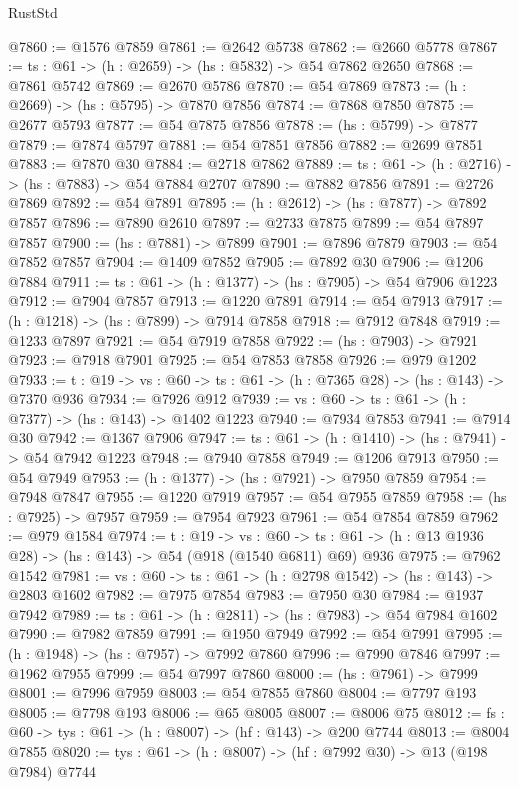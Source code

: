 \begin{lexlean}{RustStd}
\begin{coremodule}
@7860 := @1576 @7859
@7861 := @2642 @5738
@7862 := @2660 @5778
@7867 := {ts : @61} -> (h : @2659) -> (hs : @5832) -> @54 @7862 @2650
@7868 := @7861 @5742
@7869 := @2670 @5786
@7870 := @54 @7869
@7873 := (h : @2669) -> (hs : @5795) -> @7870 @7856
@7874 := @7868 @7850
@7875 := @2677 @5793
@7877 := @54 @7875 @7856
@7878 := (hs : @5799) -> @7877
@7879 := @7874 @5797
@7881 := @54 @7851 @7856
@7882 := @2699 @7851
@7883 := @7870 @30
@7884 := @2718 @7862
@7889 := {ts : @61} -> (h : @2716) -> (hs : @7883) -> @54 @7884 @2707
@7890 := @7882 @7856
@7891 := @2726 @7869
@7892 := @54 @7891
@7895 := (h : @2612) -> (hs : @7877) -> @7892 @7857
@7896 := @7890 @2610
@7897 := @2733 @7875
@7899 := @54 @7897 @7857
@7900 := (hs : @7881) -> @7899
@7901 := @7896 @7879
@7903 := @54 @7852 @7857
@7904 := @1409 @7852
@7905 := @7892 @30
@7906 := @1206 @7884
@7911 := {ts : @61} -> (h : @1377) -> (hs : @7905) -> @54 @7906 @1223
@7912 := @7904 @7857
@7913 := @1220 @7891
@7914 := @54 @7913
@7917 := (h : @1218) -> (hs : @7899) -> @7914 @7858
@7918 := @7912 @7848
@7919 := @1233 @7897
@7921 := @54 @7919 @7858
@7922 := (hs : @7903) -> @7921
@7923 := @7918 @7901
@7925 := @54 @7853 @7858
@7926 := @979 @1202
@7933 := {t : @19} -> {vs : @60} -> {ts : @61} -> (h : @7365 @28) -> (hs : @143) -> @7370 @936
@7934 := @7926 @912
@7939 := {vs : @60} -> {ts : @61} -> (h : @7377) -> (hs : @143) -> @1402 @1223
@7940 := @7934 @7853
@7941 := @7914 @30
@7942 := @1367 @7906
@7947 := {ts : @61} -> (h : @1410) -> (hs : @7941) -> @54 @7942 @1223
@7948 := @7940 @7858
@7949 := @1206 @7913
@7950 := @54 @7949
@7953 := (h : @1377) -> (hs : @7921) -> @7950 @7859
@7954 := @7948 @7847
@7955 := @1220 @7919
@7957 := @54 @7955 @7859
@7958 := (hs : @7925) -> @7957
@7959 := @7954 @7923
@7961 := @54 @7854 @7859
@7962 := @979 @1584
@7974 := {t : @19} ->
  {vs : @60} ->
  {ts : @61} -> (h : @13 @1936 @28) -> (hs : @143) -> @54 (@918 (@1540 @6811) @69) @936
@7975 := @7962 @1542
@7981 := {vs : @60} -> {ts : @61} -> (h : @2798 @1542) -> (hs : @143) -> @2803 @1602
@7982 := @7975 @7854
@7983 := @7950 @30
@7984 := @1937 @7942
@7989 := {ts : @61} -> (h : @2811) -> (hs : @7983) -> @54 @7984 @1602
@7990 := @7982 @7859
@7991 := @1950 @7949
@7992 := @54 @7991
@7995 := (h : @1948) -> (hs : @7957) -> @7992 @7860
@7996 := @7990 @7846
@7997 := @1962 @7955
@7999 := @54 @7997 @7860
@8000 := (hs : @7961) -> @7999
@8001 := @7996 @7959
@8003 := @54 @7855 @7860
@8004 := @7797 @193
@8005 := @7798 @193
@8006 := @65 @8005
@8007 := @8006 @75
@8012 := {fs : @60} -> {tys : @61} -> (h : @8007) -> (hf : @143) -> @200 @7744
@8013 := @8004 @7855
@8020 := {tys : @61} -> (h : @8007) -> (hf : @7992 @30) -> @13 (@198 @7984) @7744

\end{coremodule}
\end{lexlean}
